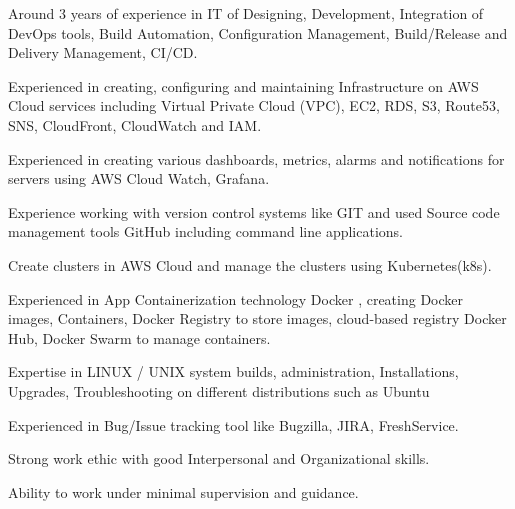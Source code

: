 \documentclass[10pt,a4paper,ragged2e,withhyper]{altacv}
\begin{document}
{\begin{paracol}{2}
\begin{itemize}
\large{
    \item Around 3 years of experience in IT of Designing, Development, Integration of DevOps tools, Build Automation, Configuration Management, Build/Release and Delivery Management, CI/CD.
    \item  Experienced in creating, configuring and maintaining Infrastructure on AWS Cloud services including Virtual Private Cloud (VPC), EC2, RDS, S3, Route53, SNS, CloudFront, CloudWatch and IAM.
    \item  Experienced in creating various dashboards, metrics, alarms and notifications for servers using AWS Cloud Watch, Grafana.
    \item  Experience working with version control systems like GIT and used Source code  management tools GitHub including command line applications.
    \item Create clusters in AWS Cloud and manage the clusters using Kubernetes(k8s).
    \item Experienced in App Containerization technology Docker , creating Docker images, Containers, Docker Registry to store images, cloud-based registry Docker Hub, Docker Swarm to manage containers.
    \item Expertise in LINUX / UNIX system builds, administration, Installations, Upgrades, Troubleshooting on different distributions such as Ubuntu
    \item Experienced in Bug/Issue tracking tool like Bugzilla, JIRA, FreshService.
    \item  Strong work ethic with good Interpersonal and Organizational skills.
    \item Ability to work under minimal supervision and guidance.   
}
\end{itemize}

\end{paracol}}
\end{document}
